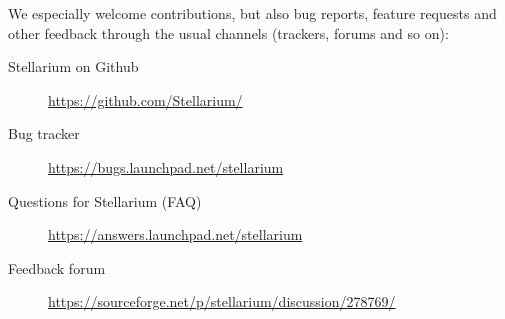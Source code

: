 We especially welcome contributions, but also bug reports, feature requests and other feedback through the
usual channels (trackers, forums and so on):
\begin{description}
\item[Stellarium on Github] \url{https://github.com/Stellarium/}
\item[Bug tracker] \url{https://bugs.launchpad.net/stellarium}
\item[Questions for Stellarium (FAQ)] \url{https://answers.launchpad.net/stellarium}
\item[Feedback forum] \url{https://sourceforge.net/p/stellarium/discussion/278769/}
\end{description}



